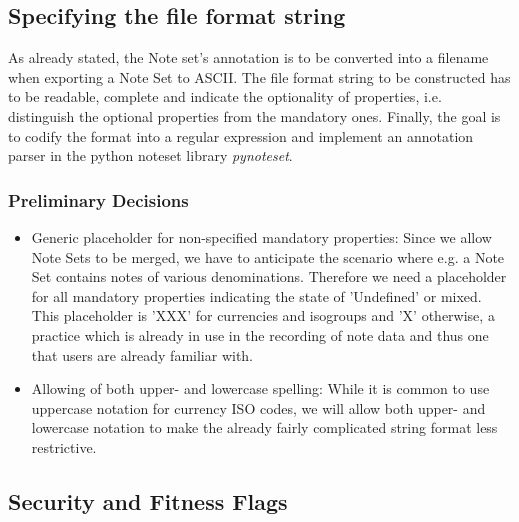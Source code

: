 \subsection{Specifying the file format string}
As already stated, the Note set's annotation is to be converted into a filename when exporting a Note Set to ASCII. The file format string to be constructed has to be readable, complete and indicate the optionality of properties, i.e. distinguish the optional properties from the mandatory ones. Finally, the goal is to codify the format into a regular expression and implement an annotation parser in the python noteset library \emph{pynoteset}.
\subsubsection{Preliminary Decisions}
\begin{itemize}
\item Generic placeholder for non-specified mandatory properties: Since we allow Note Sets to be merged, we have to anticipate the scenario where e.g. a Note Set contains notes of various denominations. Therefore we need a placeholder for all mandatory properties indicating the state of 'Undefined' or mixed. This placeholder is 'XXX' for currencies and isogroups and 'X' otherwise, a practice which is already in use in the recording of note data and thus one that users are already familiar with. 
\item Allowing of both upper- and lowercase spelling: While it is common to use uppercase notation for currency ISO codes, we will allow both upper- and lowercase notation to make the already fairly complicated string format less restrictive.
\end{itemize}



\subsection{Security and Fitness Flags}

